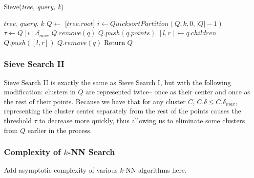 \begin{algorithm} %
    \caption{Sieve(\emph{tree, query, k})} %
    \label{alg:sieve} %
    \begin{algorithmic}[6] %
        \REQUIRE $tree$, $query$, $k$
        \STATE $Q \leftarrow$ [$tree.root$]
            \STATE $i \leftarrow QuicksortPartition(Q, k, 0, |Q| - 1)$
            \STATE $\tau \leftarrow Q[i].\delta_{max}$
                    \STATE $Q.remove(q)$
                \ENDIF
            \ENDFOR
                    \STATE $Q.push(q.points)$
                \ELSE
                    \STATE $[l, r] \leftarrow q.children$
                    \STATE $Q.push([l, r])$   
                \ENDIF
                \STATE $Q.remove(q)$
            \ENDFOR 
        \ENDWHILE
        \STATE Return $Q$
    \end{algorithmic}
    \end{algorithm}

\subsubsection{Sieve Search II}
\label{subsubsec:methods:knn-search:sieve2}
Sieve Search II is exactly the same as Sieve Search I, but with the following modification: clusters 
in $Q$ are represented twice-- once as their center and once as the rest of their points. 
Because we have that for any cluster $C$, $C.\delta \leq C.\delta_{max}$, representing the cluster 
center separately from the rest of the points causes the threshold $\tau$ to decrease more quickly, 
thus allowing us to eliminate some clusters from $Q$ earlier in the process.

\subsubsection{Complexity of $k$-NN Search}
\label{paragraph:methods:knn-complexity}
Add asymptotic complexity of various $k$-NN algorithms here.